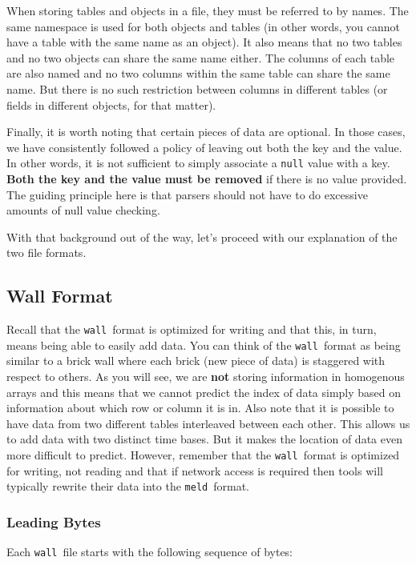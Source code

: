 \documentclass[11pt,a4paper,twocolumn]{article}
\newcommand{\wall}{\texttt{wall}}
\newcommand{\meld}{\texttt{meld}}
\newcommand{\code}[1]{\texttt{#1}} %
\begin{document}
When storing tables and objects in a file, they must be referred to by
names.  The same namespace is used for both objects and tables (in
other words, you cannot have a table with the same name as an
object).  It also means that no two tables and no two objects can
share the same name either.  The columns of each table are also named
and no two columns within the same table can share the same name.  But
there is no such restriction between columns in different tables (or
fields in different objects, for that matter).

Finally, it is worth noting that certain pieces of data are optional.
In those cases, we have consistently followed a policy of leaving out
both the key and the value.  In other words, it is not sufficient to
simply associate a \code{null} value with a key.  \textbf{Both the key
and the value must be removed} if there is no value provided.  The
guiding principle here is that parsers should not have to do excessive
amounts of null value checking.

With that background out of the way, let's proceed with our
explanation of the two file formats.

\subsection{Wall Format}
\label{sec:wall_spec}

Recall that the \wall\ format is optimized for writing and that this,
in turn, means being able to easily add data.  You can think of the
\wall\ format as being similar to a brick wall where each brick (new
piece of data) is staggered with respect to others.  As you will see,
we are \textbf{not} storing information in homogenous arrays and this
means that we cannot predict the index of data simply based on
information about which row or column it is in.  Also note that it is
possible to have data from two different tables interleaved between
each other.  This allows us to add data with two distinct time bases.
But it makes the location of data even more difficult to predict.
However, remember that the \wall\ format is optimized for writing, not
reading and that if network access is required then tools will
typically rewrite their data into the \meld\ format.

\subsubsection{Leading Bytes}

Each \wall\ file starts with the following sequence of bytes:
\end{document}
